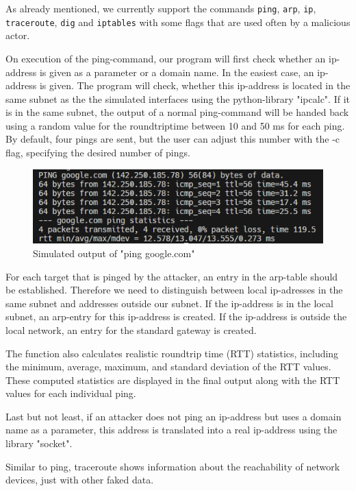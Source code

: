 As already mentioned, we currently support the commands \texttt{ping}, \texttt{arp}, \texttt{ip}, \texttt{traceroute}, \texttt{dig} and \texttt{iptables} with some flags that are used often by a malicious actor.

On execution of the ping-command, our program will first check whether an ip-address is given as a parameter or a domain name. In the easiest case, an ip-address is given. The program will check, whether this ip-address is located in the same subnet as the the simulated interfaces using the python-library "ipcalc". If it is in the same subnet, the output of a normal ping-command will be handed back using a random value for the roundtriptime between 10 and 50 ms for each ping. By default, four pings are sent, but the user can adjust this number with the -c flag, specifying the desired number of pings.

\begin{figure}[H]
    \centering
    \includegraphics[width=1\linewidth]{bilder/ping.png}
    \caption{Simulated output of "ping google.com"}
\end{figure}

For each target that is pinged by the attacker, an entry in the arp-table should be established. Therefore we need to distinguish between local ip-adresses in the same subnet and addresses outside our subnet. If the ip-address is in the local subnet, an arp-entry for this ip-address is created. If the ip-address is outside the local network, an entry for the standard gateway is created.

The function also calculates realistic roundtrip time (RTT) statistics, including the minimum, average, maximum, and standard deviation of the RTT values. These computed statistics are displayed in the final output along with the RTT values for each individual ping.

Last but not least, if an attacker does not ping an ip-address but uses a domain name as a parameter, this address is translated into a real ip-address using the library "socket".

Similar to ping, traceroute shows information about the reachability of network devices, just with other faked data.

